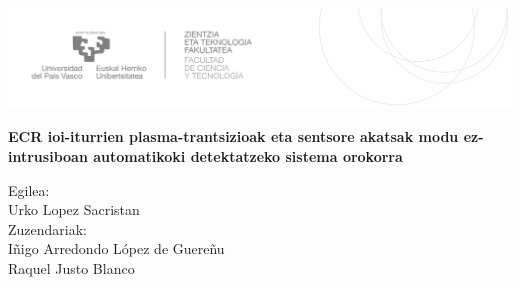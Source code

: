 \documentclass[12pt]{article}
\numberwithin{figure}{section}
\numberwithin{equation}{section}
\begin{document}

\begin{titlepage}
\hspace*{-3.5cm}
    \begin{minipage}{\textwidth}
        \vspace{-2.5cm}
        \begin{center}
    

            \includegraphics[width=\paperwidth]{LogoEHU.PNG}
        \end{center}
    \end{minipage}

\vspace{1cm}

\hspace{-3.5cm}
\noindent{}


\vspace{0.8cm}

\noindent\hspace*{-2.5cm}%
\colorbox{light-gray}{\begin{minipage}{\paperwidth}%

    \vspace{1cm}

    \color{RoyalBlue}
    \centering\Large\textbf{ECR ioi-iturrien plasma-trantsizioak eta sentsore akatsak modu ez-intrusiboan automatikoki detektatzeko sistema orokorra}
    \\


    \vspace{8cm}\mbox{}
  \end{minipage}
}
\vspace{0.8cm}

\begin{flushright}
 Egilea:
\\
Urko Lopez Sacristan
\\
Zuzendariak:
\\
Iñigo Arredondo López de Guereñu
\\
Raquel Justo Blanco                 
\\
\end{flushright}


\end{titlepage}
\end{document}
